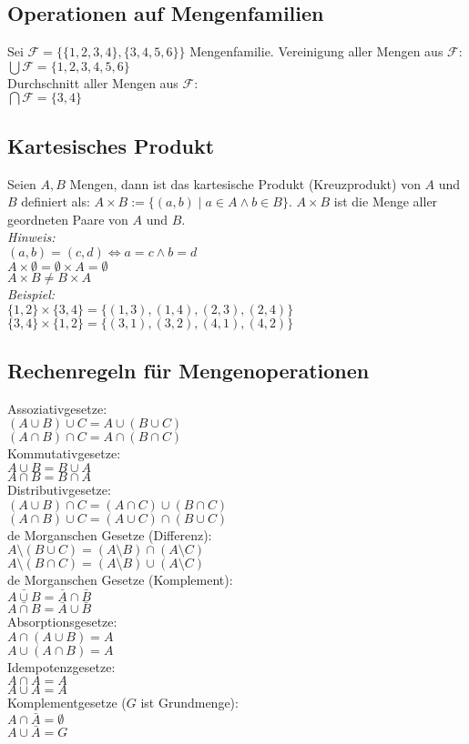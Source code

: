 \subsection*{Operationen auf Mengenfamilien}
Sei $\mathcal{F}=\{\{1,2,3,4\},\{3,4,5,6\}\}$ Mengenfamilie.
Vereinigung aller Mengen aus $\mathcal{F}$:\\
$\bigcup\mathcal{F}=\{1,2,3,4,5,6\}$\\
Durchschnitt aller Mengen aus $\mathcal{F}$:\\
$\bigcap\mathcal{F}=\{3,4\}$
\subsection*{Kartesisches Produkt}
Seien $A,B$ Mengen, dann ist das kartesische Produkt (Kreuzprodukt)
von $A$ und $B$ definiert als: $A\times B:=\{(a,b)\mid a\in A\wedge b\in B\}$. 
$A\times B$ ist die Menge aller geordneten Paare von $A$ und $B$.\\
\emph{Hinweis:}\\
$(a,b)=(c,d)\Leftrightarrow a=c\wedge b=d$\\
$A\times\emptyset=\emptyset\times A=\emptyset$\\
$A\times B\neq B\times A$\\
\emph{Beispiel:}\\
$\{1,2\}\times\{3,4\}=\{(1,3),(1,4),(2,3),(2,4)\}$\\
$\{3,4\}\times\{1,2\}=\{(3,1),(3,2),(4,1),(4,2)\}$
\subsection*{Rechenregeln für Mengenoperationen}
Assoziativgesetze:\\
$(A\cup B)\cup C=A\cup (B\cup C)$\\
$(A\cap B)\cap C=A\cap (B\cap C)$\\
Kommutativgesetze:\\
$A\cup B=B\cup A$\\
$A\cap B=B\cap A$\\
Distributivgesetze:\\
$(A\cup B)\cap C=(A\cap C)\cup (B\cap C)$\\
$(A\cap B)\cup C=(A\cup C)\cap (B\cup C)$\\
de Morganschen Gesetze (Differenz):\\
$A\setminus (B\cup C)=(A\setminus B)\cap (A\setminus C)$\\
$A\setminus (B\cap C)=(A\setminus B)\cup (A\setminus C)$\\
de Morganschen Gesetze (Komplement):\\
$\bar{A\cup B}=\bar{A}\cap\bar{B}$\\
$\bar{A\cap B}=\bar{A}\cup\bar{B}$\\
Absorptionsgesetze:\\
$A\cap (A\cup B)=A$\\
$A\cup (A\cap B)=A$\\
Idempotenzgesetze:\\
$A\cap A=A$\\
$A\cup A=A$\\
Komplementgesetze ($G$ ist Grundmenge):\\
$A\cap\bar{A}=\emptyset$\\
$A\cup\bar{A}=G$